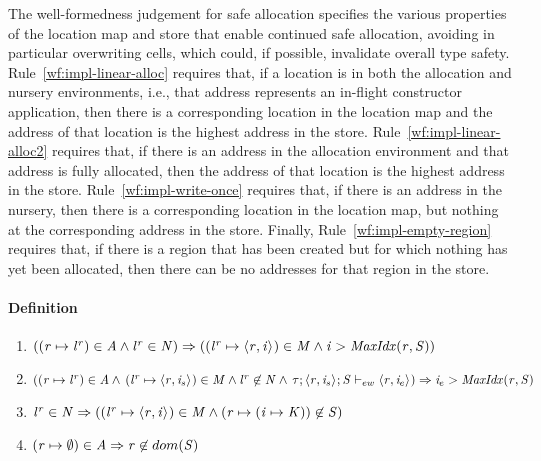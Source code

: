The well-formedness judgement for safe allocation specifies the various properties
of the location map and store that enable continued safe allocation, avoiding in particular
overwriting cells, which could, if possible, invalidate overall type safety.
%
Rule~\ref{wf:impl-linear-alloc} requires that, if a location is in both the allocation
and nursery environments, i.e., that address represents an in-flight
constructor application, then there is a corresponding location in the location
map and the address of that location is the highest address in the store.
%
Rule~\ref{wf:impl-linear-alloc2} requires that, if there is an address in the allocation
environment and that address is fully allocated, then the address of that location is the
highest address in the store.
%
Rule~\ref{wf:impl-write-once} requires that, if there is an address in the nursery, then
there is a corresponding location in the location map, but nothing at the corresponding
address in the store.
%
Finally, Rule~\ref{wf:impl-empty-region} requires that, if there is a region that has been
created but for which nothing has yet been allocated, then there can be no addresses
for that region in the store.

\paragraph{Definition}

\begin{enumerate}
    \item \label{wf:impl-linear-alloc} $ ((\mathit{r} \mapsto {\mathit{l}}^{\mathit{r}}) \in \mathit{A} \wedge {\mathit{l}}^{\mathit{r}} \in \mathit{N}) \Rightarrow \\
          (({\mathit{l}}^{\mathit{r}} \mapsto \langle \mathit{r}, \mathit{i} \rangle ^{}) \in \mathit{M} \wedge
          \mathit{i} > \mathit{MaxIdx}(\mathit{r},\mathit{S}))
          $

    \item \label{wf:impl-linear-alloc2} $ ((\mathit{r} \mapsto {\mathit{l}}^{\mathit{r}}) \in \mathit{A} \wedge
    \, ({\mathit{l}}^{\mathit{r}} \mapsto \langle \mathit{r}, \mathit{i}_s \rangle ^{}) \in \mathit{M} \wedge {\mathit{l}}^{\mathit{r}} \not \in \mathit{N} \wedge
    \, \mathit{\tau};\langle \mathit{r}, \mathit{i}_s \rangle ^{};\mathit{S} \vdash_{ew} \langle \mathit{r}, \mathit{i}_e \rangle ^{}) \Rightarrow \\
          \mathit{i}_e > \mathit{MaxIdx}(\mathit{r},\mathit{S})
          $

    \item \label{wf:impl-write-once} $ {\mathit{l}}^{\mathit{r}} \in \mathit{N} \Rightarrow \\
          (({\mathit{l}}^{\mathit{r}} \mapsto \langle \mathit{r}, \mathit{i} \rangle ^{}) \in \mathit{M} \wedge \\
          (\mathit{r} \mapsto (\mathit{i} \mapsto \mathit{K})) \not \in \mathit{S})
          $

    \item \label{wf:impl-empty-region} $(\mathit{r} \mapsto \emptyset) \in \mathit{A} \Rightarrow \\
    \mathit{r} \not \in dom(\mathit{S})$
\end{enumerate}



